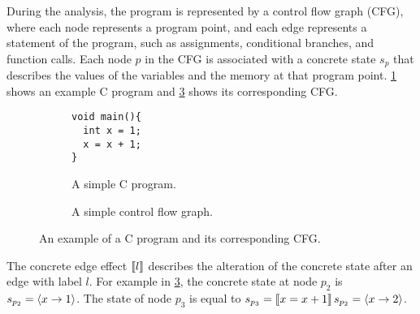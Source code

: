 During the analysis, the program is represented by a control flow graph (CFG), where each node represents a program point, and each edge represents a statement of the program,
such as assignments, conditional branches, and function calls.
Each node $p$ in the CFG is associated with a concrete state $s_p$ that describes the values of the variables and the memory at that program point.
\cref{fig:example-C-program} shows an example C program and \cref{fig:example-CFG} shows its corresponding CFG.

\begin{figure}\begin{subfigure}{0.45\textwidth}

    \begin{verbatim}
void main(){
  int x = 1;
  x = x + 1;
}
\end{verbatim}
    \caption{A simple C program.}\label{fig:example-C-program}
  \end{subfigure}
  \begin{subfigure}{0.45\textwidth}

    \caption{A simple control flow graph.}\label{fig:example-CFG}
  \end{subfigure}

  \caption{An example of a C program and its corresponding CFG.}


\end{figure}

The concrete edge effect $\llbracket l\rrbracket$ describes the alteration of the concrete state after an edge with label $l$.
For example in \cref{fig:example-CFG}, the concrete state at node $p_2$ is $s_{p_2} = \langle x \rightarrow 1\rangle$.
The state of node $p_3$ is equal to $s_{p_3} = \llbracket x = x+1\rrbracket\,s_{p_2} = \langle x \rightarrow 2\rangle$.

